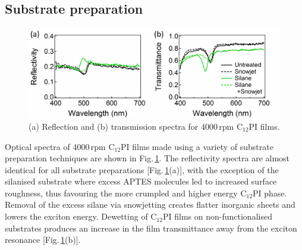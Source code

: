 \subsection{Substrate preparation}
\begin{figure}[h!]
\centering
\includegraphics[width=\textwidth]{Fig3}
\caption{(a) Reflection and (b) transmission spectra for 4000\,rpm C$_{12}$PI films.}
\label{4Fig3}
\end{figure}
Optical spectra of 4000\,rpm C$_{12}$PI films made using a variety of substrate preparation techniques are shown in Fig.\,\ref{4Fig3}. The reflectivity spectra are almost identical for all substrate preparations [Fig.\,\ref{4Fig3}(a)], with the exception of the silanised substrate where excess APTES molecules led to increased surface roughness, thus favouring the more crumpled and higher energy C$_{12}$PI phase. Removal of the excess silane via snowjetting creates flatter inorganic sheets and lowers the exciton energy. Dewetting of C$_{12}$PI films on non-functionalised substrates produces an increase in the film transmittance away from the exciton resonance [Fig.\,\ref{4Fig3}(b)].

